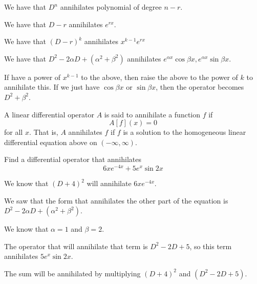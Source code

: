 \documentclass[../diffeq.tex]{subfiles}
\begin{document}
We have that $D^n$ annihilates polynomial of degree $n-r$.

We have that $D-r$ annihilates $e^{rx}$.

We have that $(D-r)^k$ annihilates $x^{k-1}e^{rx}$

We have that $D^2-2\alpha D+(\alpha^2 +\beta^2)$ annihilates $e^{\alpha x}\cos \beta x, e^{\alpha x}\sin \beta x$.

If have a power of $x^{k-1}$ to the above, then raise the above to the power of $k$ to annihilate this. If we just have $\cos \beta x$ or $\sin\beta x$, then the operator becomes $D^2+\beta ^2$.

\begin{definition}
    A linear differential operator $A$ is said to annihilate a function $f$ if 
    \[ A[f](x)=0 \]
    for all $x$. That is, $A$ annihilates $f$ if $f$ is a solution to the homogeneous linear differential equation above on $(-\infty,\infty)$.
\end{definition}

\begin{example}
    Find a differential operator that annihilates 
    \[ 6xe^{-4x}+5e^x\sin 2x \]

    We know that $(D+4)^2$ will annihilate $6xe^{-4x}$. 

    We saw that the form that annihilates the other part of the equation is $D^2-2\alpha D+(\alpha^2+\beta^2)$.

    We know that $\alpha = 1$ and $\beta = 2$.

    The operator that will annihilate that term is $D^2-2D+5$, so this term annihilates $5e^x\sin 2x$.

    The sum will be annihilated by multiplying $(D+4)^2$ and $(D^2-2D+5)$.
\end{example}
\end{document}
